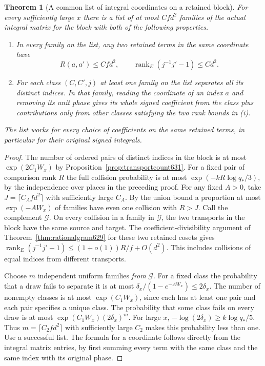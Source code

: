 \documentclass[a4paper,11pt]{article}
\newtheorem{theorem}[proposition]{Theorem}
\theoremstyle{definition}
\theoremstyle{remark}
\numberwithin{equation}{section}
\begin{document}
\begin{theorem}[A common list of integral coordinates on a retained block]
\leavevmode\label{thm:commonfamilies631}
For every sufficiently large \(x\) there is a list of at most
\(Cfd^2\) families of the actual integral matrix for the block
with both of the following properties.
\begin{enumerate}
\item In every family on the list, any two retained terms in the
same coordinate have
\[
 R(a,a')\le Cfd^2,\qquad
           \operatorname{rank}_{E}(j^{-1}j'-1)\le Cd^2 .
\]
\item For each class \((C,C',j)\) at least one family on the list
separates all its distinct indices. In that family, reading the
coordinate of an index \(a\) and removing its unit phase gives its
whole signed coefficient from the class plus contributions only
from other classes satisfying the two rank bounds in (i).
\end{enumerate}
The list works for every choice of coefficients on the same retained
terms, in particular for their original signed integrals.
\end{theorem}
\begin{proof}
The number of ordered pairs of distinct indices in the block is at
most \(\exp(2C_1 W_x)\) by Proposition~\ref{prop:transportcount631}.
For a fixed pair of comparison rank \(R\) the full collision
probability is at most \(\exp(-kR\log q_*/3)\), by the independence
over places in the preceding proof. For any fixed \(A>0\), take
\(J=\lceil C_A f d^2\rceil\) with sufficiently large \(C_A\).
By the union bound a proportion at most \(\exp(-A W_x)\) of
families have even one collision with \(R>J\).
Call the complement \(\mathcal G\). On every collision in a family
in \(\mathcal G\), the two transports in the block have the same
source and target. The coefficient-divisibility argument of
Theorem~\ref{thm:rationalgram629} for these two retained cosets
gives \(\operatorname{rank}_E(j^{-1}j'-1)
\le(1+o(1))R/f+O(d^2)\). This includes collisions of equal
indices from different transports.

Choose \(m\) independent uniform families \emph{from} \(\mathcal G\).
For a fixed class the probability that a draw fails to separate it
is at most \(\delta_x/(1-e^{-A W_x})\le2\delta_x\). The number
of nonempty classes is at most \(\exp(C_1W_x)\), since each has
at least one pair and each pair specifies a unique class.
The probability that some class fails on every draw is at most
\(\exp(C_1W_x)(2\delta_x)^m\). For large \(x\),
\(-\log(2\delta_x)\ge k\log q_*/5\). Thus
\(m=\lceil C_2fd^2\rceil\) with sufficiently large \(C_2\)
makes this probability less than one. Use a successful list.
The formula for a coordinate follows directly from the integral
matrix entries, by first summing every term with the same class
and the same index with its original phase.
\end{proof}
\end{document}
